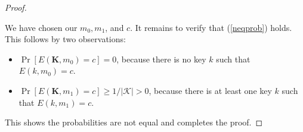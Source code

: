 \documentclass[11pt]{article}
\newcommand{\ctxts}{\mathcal{C}}
\newcommand{\keys}{\mathcal{K}}
\newcommand{\bK}{\mathbf{K}}
\begin{document}
\begin{proof}
\begin{center}
    \end{center}
    We have chosen our $m_0,m_1$, and $c$. It remains to verify that
    (\ref{neqprob}) holds. This follows by two observations:
    \begin{itemize}
        \item $\Pr[E(\bK,m_0)=c] = 0$, because there is no key $k$ such
            that $E(k,m_0)=c$.
        \item $\Pr[E(\bK,m_1)=c] \geq 1/|\keys| > 0$, because there
            is at least one key $k$ such that $E(k,m_1)=c$.
    \end{itemize}
    This shows the probabilities are not equal and completes the proof.
\end{proof}
\fi
\end{document}
